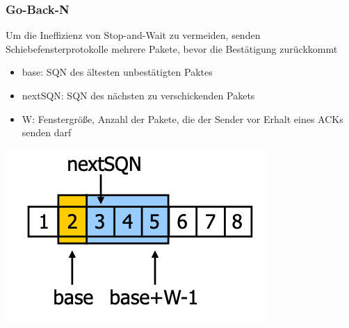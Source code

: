 \subsubsection{Go-Back-N}
Um die Ineffizienz von Stop-and-Wait zu vermeiden, senden Schiebefensterprotokolle mehrere Pakete, bevor die Bestätigung zurückkommt  
\begin{multicols}{2}
	\begin{itemize}
		\item base: SQN des ältesten unbestätigten Paktes
		\item nextSQN: SQN des nächsten zu verschickenden Pakets
		\item W: Fenstergröße, Anzahl der Pakete, die der Sender vor Erhalt eines ACKs senden darf
	\end{itemize}
	\begin{center}
	\includegraphics[scale=0.25]{images/Go-Back-N_Sendepuffer.png}		
	\end{center}
\end{multicols}
